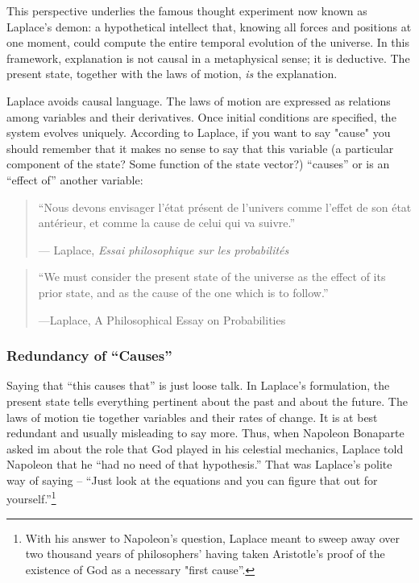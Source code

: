 \documentclass[12pt]{article}
\begin{document}
This perspective underlies the famous thought experiment now known as Laplace's demon: a hypothetical intellect that, knowing all forces and positions at one moment, could compute the entire temporal evolution of the universe. In this framework, explanation is not causal in a metaphysical sense; it is deductive. The present state, together with the laws of motion, \emph{is} the explanation.

Laplace avoids causal language. The laws of motion are expressed as relations among variables and their derivatives. Once initial conditions are specified, the system evolves uniquely. According to Laplace, if you want to say "cause" you should remember that it makes no sense to say that this variable (a particular component of the state? Some function of the state vector?) ``causes'' or is an ``effect of'' another variable:

\begin{quote}
``Nous devons envisager l'\'etat pr\'esent de l'univers comme l'effet de son \'etat ant\'erieur, et comme la cause de celui qui va suivre.''

\medskip
\raggedleft --- Laplace, \emph{Essai philosophique sur les probabilit\'es}
\end{quote}

\begin{quote}
``We must consider the present state of the universe as the effect of its prior state, and as the cause of the one which is to follow.''
\medskip

 \raggedleft ---Laplace, A Philosophical Essay on Probabilities 

\end{quote}


\subsubsection*{Redundancy of ``Causes''}
%

Saying that  ``this causes that'' is just  loose talk.  In Laplace's formulation, the present state tells everything pertinent about the past and about the future. The laws of motion tie together variables and their rates of change. It is at best redundant and usually  misleading  to say more.
Thus, when Napoleon Bonaparte asked im  about the role that God played in his celestial mechanics, Laplace 
told Napoleon  that he ``had no need of that hypothesis.'' That was Laplace's polite way of saying -- ``Just look at the equations and you can figure that out for yourself.''\footnote{With his answer to Napoleon's question, Laplace meant to sweep away over two thousand years of philosophers' having taken Aristotle's proof of the existence of God as a necessary "first cause''.}
\end{document}
